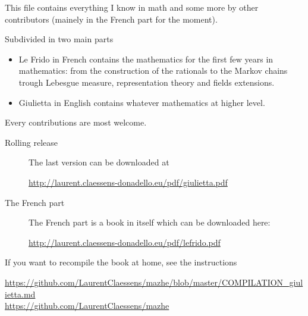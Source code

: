 
\thispagestyle{empty}

This file contains everything I know in math and some more by other contributors (mainely in the French part for the moment).

Subdivided in two main parts
\begin{itemize}
    \item Le Frido in French contains the mathematics for the first few years in mathematics: from the construction of the rationals to the Markov chains trough Lebesgue measure, representation theory and fields extensions.
    \item Giulietta in English contains whatever mathematics at higher level.
\end{itemize}

\begin{center}
    Every contributions are most welcome.
\end{center}

\begin{description}

    \item[Rolling release]

        The last version can be downloaded at
        \begin{center}
            \url{http://laurent.claessens-donadello.eu/pdf/giulietta.pdf}
        \end{center}

    \item[The French part]
        The French part is a book in itself which can be downloaded here:
        \begin{center}
            \url{http://laurent.claessens-donadello.eu/pdf/lefrido.pdf}
        \end{center}

\end{description}

If you want to recompile the book at home, see the instructions
        \begin{center}
            \url{https://github.com/LaurentClaessens/mazhe/blob/master/COMPILATION_giulietta.md}\\
            \url{https://github.com/LaurentClaessens/mazhe}
        \end{center}

